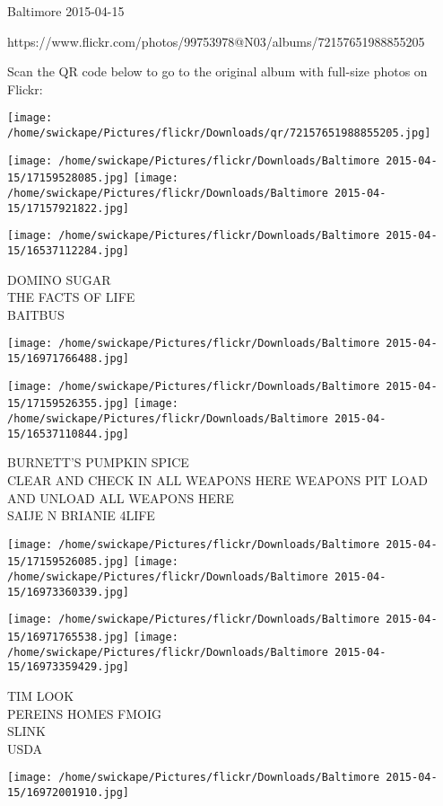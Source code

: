 \documentclass[10pt,letterpaper]{article}
\begin{document}
Baltimore 2015-04-15

https://www.flickr.com/photos/99753978@N03/albums/72157651988855205

Scan the QR code below to go to the original album with full-size photos on Flickr:

\texttt{[image: /home/swickape/Pictures/flickr/Downloads/qr/72157651988855205.jpg]}
\pagebreak

\texttt{[image: /home/swickape/Pictures/flickr/Downloads/Baltimore 2015-04-15/17159528085.jpg]}
\texttt{[image: /home/swickape/Pictures/flickr/Downloads/Baltimore 2015-04-15/17157921822.jpg]}

\texttt{[image: /home/swickape/Pictures/flickr/Downloads/Baltimore 2015-04-15/16537112284.jpg]}

DOMINO SUGAR\\
THE FACTS OF LIFE\\
BAITBUS
\pagebreak

\texttt{[image: /home/swickape/Pictures/flickr/Downloads/Baltimore 2015-04-15/16971766488.jpg]}

\vspace{0.25in}
\texttt{[image: /home/swickape/Pictures/flickr/Downloads/Baltimore 2015-04-15/17159526355.jpg]}
\texttt{[image: /home/swickape/Pictures/flickr/Downloads/Baltimore 2015-04-15/16537110844.jpg]}

BURNETT'S PUMPKIN SPICE\\
CLEAR AND CHECK IN ALL WEAPONS HERE WEAPONS PIT LOAD AND UNLOAD ALL WEAPONS HERE\\
SAIJE N BRIANIE 4LIFE
\pagebreak

\texttt{[image: /home/swickape/Pictures/flickr/Downloads/Baltimore 2015-04-15/17159526085.jpg]}
\texttt{[image: /home/swickape/Pictures/flickr/Downloads/Baltimore 2015-04-15/16973360339.jpg]}

\texttt{[image: /home/swickape/Pictures/flickr/Downloads/Baltimore 2015-04-15/16971765538.jpg]}
\texttt{[image: /home/swickape/Pictures/flickr/Downloads/Baltimore 2015-04-15/16973359429.jpg]}

TIM LOOK\\
PEREINS HOMES FMOIG\\
SLINK\\
USDA
\pagebreak

\texttt{[image: /home/swickape/Pictures/flickr/Downloads/Baltimore 2015-04-15/16972001910.jpg]}
\end{document}
